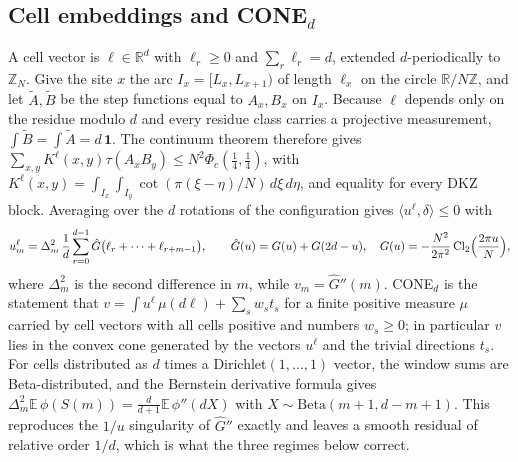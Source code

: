 \documentclass[11pt]{article}
\newcommand{\R}{\mathbb{R}}
\newcommand{\Z}{\mathbb{Z}}
\newcommand{\one}{\mathbf{1}}
\newcommand{\Cl}{\operatorname{Cl}_2}
\begin{document}
\subsection*{Cell embeddings and CONE$_d$}
A cell vector is $\ell\in\R^d$ with $\ell_r\ge0$ and $\sum_r\ell_r=d$, extended $d$-periodically to $\Z_N$. Give the
site $x$ the arc $I_x=[L_x,L_{x+1})$ of length $\ell_x$ on the circle $\R/N\Z$, and let $\tilde A,\tilde B$ be the step
functions equal to $A_x,B_x$ on $I_x$. Because $\ell$ depends only on the residue modulo $d$ and every residue class
carries a projective measurement, $\int\tilde B=\int\tilde A=d\,\one$. The continuum theorem therefore gives
$\sum_{x,y}K^\ell(x,y)\tau(A_xB_y)\le N^2\Phi_c(\frac14,\frac14)$, with
$K^\ell(x,y)=\int_{I_x}\int_{I_y}\cot(\pi(\xi-\eta)/N)\,d\xi\,d\eta$, and equality for every DKZ block. Averaging over
the $d$ rotations of the configuration gives $\langle u^\ell,\delta\rangle\le0$ with
\begin{equation}\label{eq:ul}
u^\ell_m=\Delta^2_m\,\frac1d\sum_{r=0}^{d-1}\hat G\bigl(\ell_r+\dots+\ell_{r+m-1}\bigr),\qquad
\hat G(u)=G(u)+G(2d-u),\quad G(u)=-\frac{N^2}{2\pi^2}\Cl\Bigl(\frac{2\pi u}{N}\Bigr),
\end{equation}
where $\Delta^2_m$ is the second difference in $m$, while $v_m=\hat G''(m)$. CONE$_d$ is the statement that
$v=\int u^\ell\,\mu(d\ell)+\sum_sw_st_s$ for a finite positive measure $\mu$ carried by cell vectors with all cells
positive and numbers $w_s\ge0$; in particular $v$ lies in the convex cone generated by the vectors $u^\ell$ and the
trivial directions $t_s$. For cells distributed as $d$
times a Dirichlet$(1,\dots,1)$ vector, the window sums are Beta-distributed, and the Bernstein derivative formula gives
$\Delta^2_m\mathbb{E}\,\phi(S(m))=\frac{d}{d+1}\mathbb{E}\,\phi''(dX)$ with $X\sim\mathrm{Beta}(m+1,d-m+1)$. This
reproduces the $1/u$ singularity of $\hat G''$ exactly and leaves a smooth residual of relative order $1/d$, which is
what the three regimes below correct.
\end{document}

